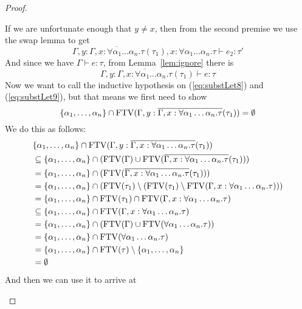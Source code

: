 \begin{proof}
\begin{description}
  If we are unfortunate enough that $y \ne x$, then from the second
  premise we use the swap lemma to get
  \begin{equation}\label{eq:substLet8}
    \Gamma , y : \overline{\Gamma, x : \forall\alpha_1\ldots\alpha_n . \tau}(\tau_1), x : \forall \alpha_1\ldots\alpha_n . \tau  \vdash
    e_2 : \tau'
  \end{equation}
  And since we have $\Gamma \vdash e : \tau$, from Lemma~\ref{lem:ignore}
  there is
  \begin{equation}\label{eq:substLet9}
  \Gamma , y : \overline{\Gamma , x :\forall\alpha_1\ldots\alpha_n . \tau}(\tau_1) \vdash e : \tau    
  \end{equation}
  Now we want to call the inductive hypothesis on (\ref{eq:substLet8})
  and (\ref{eq:substLet9}), but that means we first need to show
  \[\{ \alpha_1,\ldots,\alpha_n\} \cap \operatorname{FTV}(\Gamma , y : \overline{\Gamma, x : \forall\alpha_1\ldots\alpha_n . \tau}(\tau_1))
    = \emptyset\]
  We do this as follows:
  \begin{align*}
    & \{ \alpha_1,\ldots,\alpha_n\} \cap \operatorname{FTV}(\Gamma , y : \overline{\Gamma, x : \forall\alpha_1\ldots\alpha_n . \tau}(\tau_1)) \\
    &\subseteq \{ \alpha_1,\ldots,\alpha_n\} \cap (\operatorname{FTV}(\Gamma) \cup \operatorname{FTV}(\overline{\Gamma, x : \forall\alpha_1\ldots\alpha_n
      . \tau}(\tau_1))) \\
    &= \{ \alpha_1,\ldots,\alpha_n\} \cap (\operatorname{FTV}(\overline{\Gamma, x : \forall\alpha_1\ldots\alpha_n . \tau}(\tau_1)))
    \\
    &= \{ \alpha_1,\ldots,\alpha_n\} \cap (\operatorname{FTV}(\tau_1) \setminus (\operatorname{FTV}(\tau_1) \setminus \operatorname{FTV}(\Gamma,x:\forall
      \alpha_1\ldots\alpha_n.\tau))) \\
    &= \{ \alpha_1,\ldots,\alpha_n\} \cap \operatorname{FTV}(\tau_1) \cap \operatorname{FTV}(\Gamma, x : \forall \alpha_1\ldots\alpha_n . \tau) \\
    &\subseteq \{ \alpha_1,\ldots,\alpha_n\} \cap \operatorname{FTV}(\Gamma, x : \forall \alpha_1\ldots\alpha_n . \tau) \\
    &= \{ \alpha_1,\ldots,\alpha_n\} \cap (\operatorname{FTV}(\Gamma) \cup \operatorname{FTV}(\forall \alpha_1\ldots\alpha_n . \tau)) \\
    &= \{ \alpha_1,\ldots,\alpha_n\} \cap \operatorname{FTV}(\forall \alpha_1\ldots\alpha_n . \tau) \\
    &= \{ \alpha_1,\ldots,\alpha_n\} \cap \operatorname{FTV}(\tau) \setminus \{\alpha_1,\ldots,\alpha_n\} \\
    &= \emptyset
  \end{align*}
  And then we can use it to arrive at

\end{description}
\end{proof}
